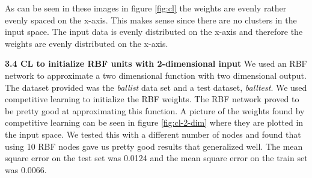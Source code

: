 \documentclass[a4paper]{article}
\begin{document}
As can be seen in these images in figure \ref{fig:cl} the weights are evenly rather evenly spaced on the x-axis. This makes sense since there are no clusters in the input space. The input data is evenly distributed on the x-axis and therefore the weights are evenly distributed on the x-axis.

\textbf{3.4 CL to initialize RBF units with 2-dimensional input}
We used an RBF network to approximate a two dimensional function with two dimensional output. The dataset provided was the \textit{ballist} data set and a test dataset, \textit{balltest}. We used competitive learning to initialize the RBF weights. The RBF network proved to be pretty good at approximating this function. A picture of the weights found by competitive learning can be seen in figure \ref{fig:cl-2-dim} where they are plotted in the input space. We tested this with a different number of nodes and found that using 10 RBF nodes gave us pretty good results that generalized well. The mean square error on the test set was 0.0124 and the mean square error on the train set was 0.0066.
\end{document}
